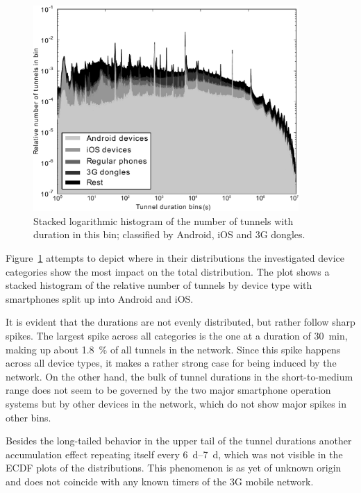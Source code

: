 \begin{figure}[htb]
    \centering
    \includegraphics[width=0.9\textwidth]{images/stacked-durations-2-fixed.pdf}
    \caption{Stacked logarithmic histogram of the number of tunnels with duration in this bin; classified by Android, iOS and 3G dongles.}
    \label{c4:fig:stacked-durations}
\end{figure}


Figure~\ref{c4:fig:stacked-durations} attempts to depict where in their distributions the investigated device categories show the most impact on the total distribution. The plot shows a stacked histogram of the relative number of tunnels by device type with smartphones split up into Android and iOS.

It is evident that the durations are not evenly distributed, but rather follow sharp spikes. The largest spike across all categories is the one at a duration of \SI{30}{\minute}, making up about \SI{1.8}{\percent} of all tunnels in the network. Since this spike happens across all device types, it makes a rather strong case for being induced by the network. On the other hand, the bulk of tunnel durations in the short-to-medium range does not seem to be governed by the two major smartphone operation systems but by other devices in the network, which do not show major spikes in other bins.

Besides the long-tailed behavior in the upper tail of the tunnel durations another accumulation effect repeating itself every \SIrange{6}{7}{\day}, which was not visible in the \gls{ECDF} plots of the distributions. This phenomenon is as yet of unknown origin and does not coincide with any known timers of the \gls{3G} mobile network.

